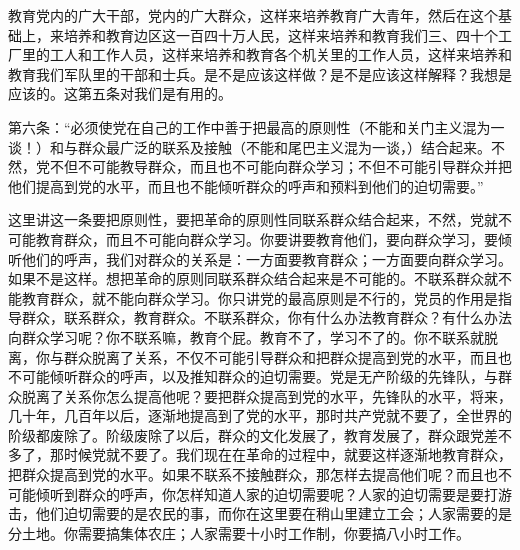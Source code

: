 教育党内的广大干部，党内的广大群众，这样来培养教育广大青年，然后在这个基础上，来培养和教育边区这一百四十万人民，这样来培养和教育我们三、四十个工厂里的工人和工作人员，这样来培养和教育各个机关里的工作人员，这样来培养和教育我们军队里的干部和士兵。是不是应该这样做？是不是应该这样解释？我想是应该的。这第五条对我们是有用的。

第六条：“必须使党在自己的工作中善于把最高的原则性（不能和关门主义混为一谈！）和与群众最广泛的联系及接触（不能和尾巴主义混为一谈，）结合起来。不然，党不但不可能教导群众，而且也不可能向群众学习；不但不可能引导群众并把他们提高到党的水平，而且也不能倾听群众的呼声和预料到他们的迫切需要。”

这里讲这一条要把原则性，要把革命的原则性同联系群众结合起来，不然，党就不可能教育群众，而且不可能向群众学习。你要讲要教育他们，要向群众学习，要倾听他们的呼声，我们对群众的关系是：一方面要教育群众；一方面要向群众学习。如果不是这样。想把革命的原则同联系群众结合起来是不可能的。不联系群众就不能教育群众，就不能向群众学习。你只讲党的最高原则是不行的，党员的作用是指导群众，联系群众，教育群众。不联系群众，你有什么办法教育群众？有什么办法向群众学习呢？你不联系嘛，教育个屁。教育不了，学习不了的。你不联系就脱离，你与群众脱离了关系，不仅不可能引导群众和把群众提高到党的水平，而且也不可能倾听群众的呼声，以及推知群众的迫切需要。党是无产阶级的先锋队，与群众脱离了关系你怎么提高他呢？要把群众提高到党的水平，先锋队的水平，将来，几十年，几百年以后，逐渐地提高到了党的水平，那时共产党就不要了，全世界的阶级都废除了。阶级废除了以后，群众的文化发展了，教育发展了，群众跟党差不多了，那时候党就不要了。我们现在在革命的过程中，就要这样逐渐地教育群众，把群众提高到党的水平。如果不联系不接触群众，那怎样去提高他们呢？而且也不可能倾听到群众的呼声，你怎样知道人家的迫切需要呢？人家的迫切需要是要打游击，他们迫切需要的是农民的事，而你在这里要在稍山里建立工会；人家需要的是分土地。你需要搞集体农庄；人家需要十小时工作制，你要搞八小时工作。

